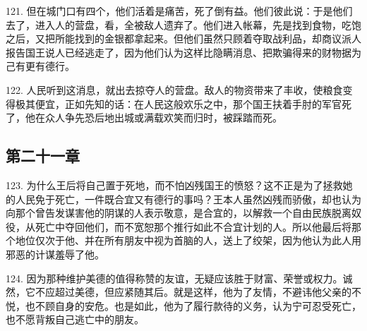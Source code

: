 121. 但在城门口有四个，他们活着是痛苦，死了倒有益。他们彼此说：于是他们去了，进入人的营盘，看，全被敌人遗弃了。他们进入帐幕，先是找到食物，吃饱之后，又把所能找到的金银都拿起来。但他们虽然只顾着夺取战利品，却商议派人报告国王说人已经逃走了，因为他们认为这样比隐瞒消息、把欺骗得来的财物据为己有更有德行。\par

122. 人民听到这消息，就出去掠夺人的营盘。敌人的物资带来了丰收，使粮食变得极其便宜，正如先知的话：在人民这般欢乐之中，那个国王扶着手肘的军官死了，他在众人争先恐后地出城或满载欢笑而归时，被踩踏而死。\par


\subsection{第二十一章}

\par

123. 为什么王后将自己置于死地，而不怕凶残国王的愤怒？这不正是为了拯救她的人民免于死亡，一件既合宜又有德行的事吗？王本人虽然凶残而骄傲，却也认为向那个曾告发谋害他的阴谋的人表示敬意，是合宜的，以解救一个自由民族脱离奴役，从死亡中夺回他们，而不宽恕那个推行如此不合宜计划的人。所以他最后将那个地位仅次于他、并在所有朋友中视为首脑的人，送上了绞架，因为他认为此人用邪恶的计谋羞辱了他。\par

124. 因为那种维护美德的值得称赞的友谊，无疑应该胜于财富、荣誉或权力。诚然，它不应超过美德，但应紧随其后。就是这样，他为了友情，不避讳他父亲的不悦，也不顾自身的安危。也是如此，他为了履行款待的义务，认为宁可忍受死亡，也不愿背叛自己逃亡中的朋友。\par


